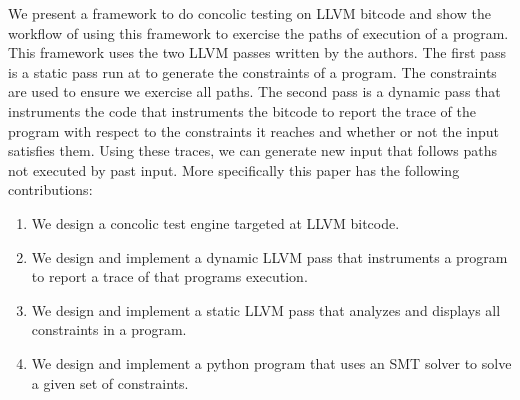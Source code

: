 We present a framework to do concolic testing on LLVM bitcode and show
the workflow of using this framework to exercise the paths of execution
of a program. This framework uses the two LLVM passes written by the authors.
The first pass is a static pass run at to generate the constraints of a program.
The constraints are used to ensure we exercise all paths. The second pass is a dynamic pass
that instruments the code that instruments the bitcode to report the trace of the program
with respect to the constraints it reaches and whether or not the input satisfies them.
Using these traces, we can generate new input that follows paths not executed
by past input. More specifically this paper has the following contributions:

\begin{enumerate}
    \item We design a concolic test engine targeted at LLVM bitcode.
    \item We design and implement a dynamic LLVM pass that instruments a program to report a trace of that programs execution.
    \item We design and implement a static LLVM pass that analyzes and displays all constraints in a program.
    \item We design and implement a python program that uses an SMT solver to solve a given set of constraints.
\end{enumerate}